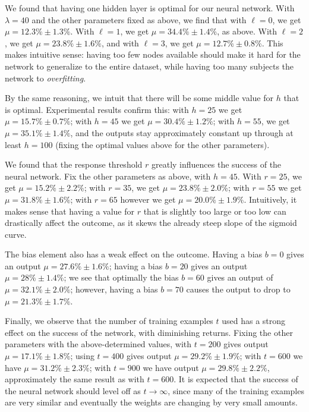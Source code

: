 \documentclass[11pt]{article}
\begin{document}
We found that having one hidden layer is optimal for our neural network. With $\lambda=40$ and the other parameters fixed as above, we find that with $\ell=0$, we get $\mu=12.3\% \pm 1.3\%$. With $\ell=1$, we get $\mu=34.4\% \pm 1.4\%$, as above. With $\ell=2$, we get $\mu=23.8\% \pm 1.6\%$, and with $\ell=3$, we get $\mu=12.7\% \pm 0.8\%$. This makes intuitive sense: having too few nodes available should make it hard for the network to generalize to the entire dataset, while having too many subjects the network to \emph{overfitting}.

By the same reasoning, we intuit that there will be some middle value for $h$ that is optimal. Experimental results confirm this: with $h=25$ we get $\mu=15.7\% \pm 0.7\%$; with $h=45$ we get $\mu=30.4\% \pm 1.2\%$; with $h=55$, we get $\mu=35.1\% \pm 1.4\%$, and the outputs stay approximately constant up through at least $h=100$ (fixing the optimal values above for the other parameters).

We found that the response threshold $r$ greatly influences the success of the neural network. Fix the other parameters as above, with $h=45$. With $r=25$, we get $\mu=15.2\% \pm 2.2\%$; with $r=35$, we get $\mu=23.8\%\pm 2.0\%$; with $r=55$ we get $\mu=31.8\% \pm 1.6\%$; with $r=65$ however we get $\mu=20.0\% \pm 1.9\%$. Intuitively, it makes sense that having a value for $r$ that is slightly too large or too low can drastically affect the outcome, as it skews the already steep slope of the sigmoid curve.

The bias element also has a weak effect on the outcome. Having a bias $b=0$ gives an output $\mu=27.6\% \pm 1.6\%$; having a bias $b=20$ gives an output $\mu=28\%\pm 1.4\%$; we see that optimally the bias $b=60$ gives an output of $\mu=32.1\% \pm 2.0\%$; however, having a bias $b=70$ causes the output to drop to $\mu=21.3\% \pm 1.7\%$.

Finally, we observe that the number of training examples $t$ used has a strong effect on the success of the network, with diminishing returns. Fixing the other parameters with the above-determined values, with $t=200$ gives output $\mu=17.1\% \pm 1.8\%$; using $t=400$ gives output $\mu=29.2\%\pm 1.9\%$; with $t=600$ we have $\mu=31.2\%\pm 2.3\%$; with $t=900$ we have output $\mu=29.8\% \pm 2.2\%$, approximately the same result as with $t=600$. It is expected that the success of the neural network should level off as $t\to\infty$, since many of the training examples are very similar and eventually the weights are changing by very small amounts.
\end{document}
